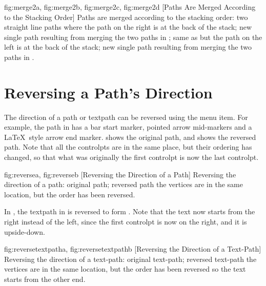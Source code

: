 {
  {fig:merge2a}{}{},
  {fig:merge2b}{}{},
  {fig:merge2c}{}{},
  {fig:merge2d}{}{}
}
[Paths Are Merged According to the Stacking Order]
{Paths are merged according to the stacking order:
 two straight line paths where the path 
on the right is at the back of the stack;
 new single path resulting from merging 
the two paths in ;
 same as  but the path on the left
is at the back of the stack;
 new single path resulting from merging 
the two paths in .}


\section{Reversing a Path's Direction}\label{sec:reversing}


The direction of a \gls{path} or \gls{textpath} can be reversed
using the  menu item. For example, the path
in  has a bar start marker, pointed arrow
mid-markers and a \LaTeX\ style arrow end marker.
 shows the original path, and
 shows the reversed path. Note that all the
\glspl{controlpt} are in the same place, but their ordering has
changed, so that what was originally the first \gls{controlpt} is
now the last \gls{controlpt}.

{
  {fig:reversea}{}{},
  {fig:reverseb}{}{}
}
[Reversing the Direction of a Path]
{Reversing the direction of a path:
 original path;
 reversed path\dash
the vertices are in the same location, but the order has been
reversed.}

In , the \gls*{textpath} in
 is reversed to form 
. Note that the text now starts
from the right instead of the left, since the first \gls*{controlpt}
is now on the right, and it is upside-down.

{
  {fig:reversetextpatha}{}{},
  {fig:reversetextpathb}{}{}
}
[Reversing the Direction of a Text-Path]
{Reversing the direction of a text-path:
 original text-path;
 reversed text-path\dash 
the vertices are in the same location, but the order has been
reversed so the text starts from the other end.}

